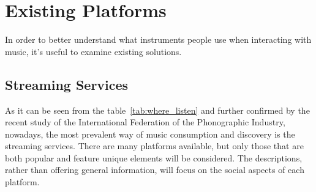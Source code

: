 \chapter{Existing Platforms}
In order to better understand what instruments people use when interacting with music,
it’s useful to examine existing solutions.




\section{Streaming Services}
As it can be seen from the table~\ref{tab:where_listen} and further confirmed by
the recent study of the International Federation of the Phonographic Industry\cite{music_stats_2024},
nowadays, the most prevalent way of music consumption
and discovery is the streaming services. There are many platforms available,
but only those that are both popular and feature unique elements will be considered.
The descriptions, rather than offering general information, will focus on the social aspects of each platform.

